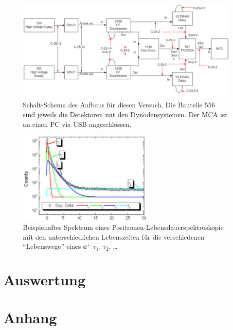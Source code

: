 \documentclass[numbers=noenddot,a4paper]{scrartcl}
\newcommand{\ix}[1]{_\text{#1}}
\begin{document}
			\begin{figure}[t]
				\centering
				\includegraphics[width=\textwidth]{aufbau.png}
				\caption{Schalt-Schema des Aufbaus für diesen Versuch. Die Bauteile 556 sind jeweils die Detektoren mit den Dynodensystemen. Der MCA ist an einen PC via USB angeschlossen. \cite{EMAUGreifswaldPKO}}
				\label{img:aufbau}
			\end{figure}

			\begin{figure}[h]
				\centering
				\includegraphics[width=0.6\textwidth]{beispielspektrum.png}
				\caption{Beispiehaftes Spektrum eines Positronen-Lebensdauerspektroskopie mit den unterschiedlichen Lebenszeiten für die verschiedenen "`Lebenswege"' eines $\textbf{e}^+$ $\tau\ix{1}$, $\tau\ix{2}$, \dots \cite{Augsten08}}
				\label{img:beispielspektrum}
			\end{figure}

	\newpage
	\section{Auswertung}
	
	\newpage
	\section{Anhang}

		
		
\end{document}
